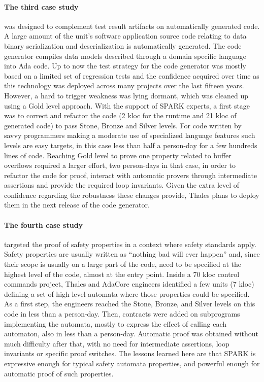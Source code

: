 \documentclass{llncs}
\begin{document}
\paragraph{The third case study} was designed to complement test result artifacts on
automatically generated code. A large amount of the unit's software application source
code relating to data binary serialization and deserialization is automatically
generated. The code generator compiles data models described through a domain
specific language into Ada code. Up to now
the test strategy for the code generator was mostly based on a limited set of
regression tests and the confidence acquired over time as this
technology was deployed across many projects over the last fifteen years. However, a hard to
trigger weakness was lying dormant, which was cleaned up using a Gold
level approach. With the support of SPARK experts, a first stage was to correct
and refactor the code (2 kloc for the runtime and 21 kloc of generated code) to
pass Stone, Bronze and Silver levels. For code written by savvy programmers
making a moderate use of specialized language features such levels are easy
targets, in this case less than half a person-day for a few hundreds lines of
code. Reaching Gold level to prove one property related to buffer overflows
required a larger effort, two person-days in that case, in order to refactor
the code for proof, interact with automatic provers through intermediate
assertions and provide the required loop invariants. Given the extra level of
confidence regarding the robustness these changes provide, Thales plans to
deploy them in the next release of the code generator.

\paragraph{The fourth case study} targeted the proof of safety properties in a context where
safety standards apply. Safety properties are usually written as “nothing bad
will ever happen” and, since their scope is usually on a large part of the
code, need to be specified at the highest level of the code, almost at the
entry point. Inside a 70 kloc control commands project, Thales and AdaCore
engineers identified a few units (7 kloc) defining a set of high level automata
where those properties could be specified.  As a first step, the engineers reached the
Stone, Bronze, and Silver levels on this code in less than a person-day. Then,
contracts were added on subprograms implementing the automata, mostly to
express the effect of calling each automaton, also in less than a
person-day. Automatic proof was obtained without much difficulty after that,
with no need for intermediate assertions, loop invariants or specific proof
switches. The lessons learned here are that SPARK is expressive enough for
typical safety automata properties, and powerful enough for automatic proof of
such properties.
\end{document}
